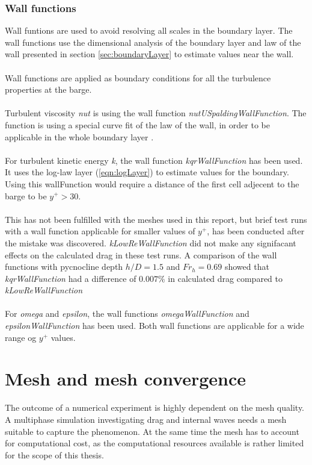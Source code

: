 \documentclass[a4paper, 12pt]{report}
\begin{document}
\subsubsection{Wall functions}
Wall funtions are used to avoid resolving all scales in the boundary layer. The wall functions use the dimensional analysis of the boundary layer and law of the wall presented in section \ref{sec:boundaryLayer} to estimate values near the wall.\\
\\
Wall functions are applied as boundary conditions for all the turbulence properties at the barge.\\
\\
Turbulent viscosity \textit{nut} is using the wall function \textit{nutUSpaldingWallFunction}. The function is using a special curve fit of the law of the wall, in order to be applicable in the whole boundary layer \cite{Spalding}.\\
\\
For turbulent kinetic energy \textit{k}, the wall function \textit{kqrWallFunction} has been used. It uses the log-law layer (\ref{eqn:logLayer}) to estimate values for the boundary. Using this wallFunction would require a distance of the first cell adjecent to the barge to be $y^+ > 30$.\\
\\
This has not been fulfilled with the meshes used in this report, but brief test runs with a wall function applicable for smaller values of $y^+$, has been conducted after the mistake was discovered. \textit{kLowReWallFunction} did not make any signifacant effects on the calculated drag in these test runs. A comparison of the wall functions with pycnocline depth $h/D=1.5$ and $Fr_h=0.69$ showed that \textit{kqrWallFunction} had a difference of $0.007\%$ in calculated drag compared to \textit{kLowReWallFunction}\\
\\
For \textit{omega} and \textit{epsilon}, the wall functions \textit{omegaWallFunction} and \textit{epsilonWallFunction} has been used. Both wall functions are applicable for a wide range og $y^+$ values.
\section{Mesh and mesh convergence}
The outcome of a numerical experiment is highly dependent on the mesh quality. A multiphase simulation investigating drag and internal waves needs a mesh suitable to capture the phenomenon. At the same time the mesh has to account for computational cost, as the computational resources available is rather limited for the scope of this thesis.
\end{document}
